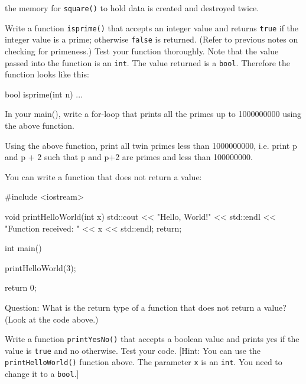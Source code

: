 the memory for \texttt{square()} to hold data is created and destroyed twice.

\begin{ex}
Write a function \texttt{isprime()} that accepts an integer value and returns \texttt{true} if the integer value is a prime; otherwise \texttt{false} is returned. (Refer to previous notes on checking for primeness.) Test your function thoroughly. Note that the value passed into the function is an \texttt{int}. The value returned is a \texttt{bool}. Therefore the function looks like this:

\begin{consolethree}[escapeinside=||]
bool isprime(int n)
{
    ...
}
\end{consolethree}

In your main(), write a for-loop that prints all the primes up to 1000000000 using the above function.
\end{ex}

\begin{ex}
Using the above function, print all twin primes less than 1000000000, i.e. print p and p + 2 such that p and p+2 are primes and less than 100000000.
\end{ex}


\newpage{}

You can write a function that does not return a value:

\begin{consolethree}[escapeinside=||]
#include <iostream>

void printHelloWorld(int x)
{
    std::cout << "Hello, World!" << std::endl
              << "Function received: "
              << x
              << std::endl;
    return;
}

int main()
{
    printHelloWorld(3);

    return 0;
}
\end{consolethree}

Question: What is the return type of a function that does not return a value? (Look at the code above.)

\begin{ex}
Write a function \texttt{printYesNo()} that accepts a boolean value and prints yes if the value is \texttt{true} and no otherwise. Test your code. [Hint: You can use the \texttt{printHelloWorld()} function above. The parameter \texttt{x} is an \texttt{int}. You need to change it to a \texttt{bool}.]
\end{ex}

